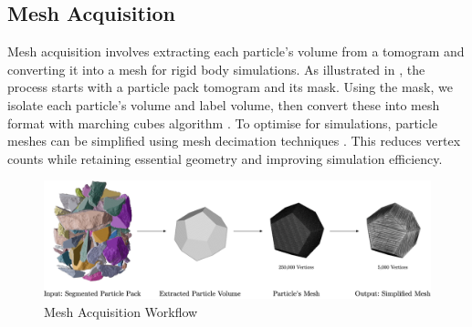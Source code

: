 \documentclass[preprint,12pt]{elsarticle}
\begin{document}
\subsection{Mesh Acquisition}
Mesh acquisition involves extracting each particle's volume from a tomogram and converting it into a mesh for rigid body simulations. 
As illustrated in , the process starts with a particle pack tomogram and its mask. 
Using the mask, we isolate each particle's volume and label volume, then convert these into mesh format with marching cubes algorithm \citep{lorensen1987marching}.
To optimise for simulations, particle meshes can be simplified using mesh decimation techniques \citep{garland1997surface}. 
This reduces vertex counts while retaining essential geometry and improving simulation efficiency.
\begin{figure}[h!]
    \includegraphics[width=\textwidth]{figures/img/mesh-acquisition.png}
    \caption{Mesh Acquisition Workflow}
    \label{fig:mesh_acquisition_workflow}
\end{figure}
\end{document}
